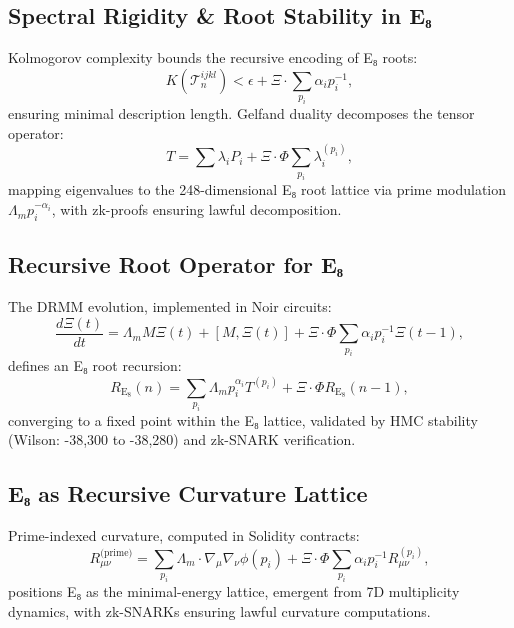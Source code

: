 \documentclass{article}
\theoremstyle{plain}
\begin{document}
\subsection{Spectral Rigidity \& Root Stability in E₈}
Kolmogorov complexity bounds the recursive encoding of E₈ roots:
\begin{equation}
K(\mathcal{T}_n^{ijkl}) < \epsilon + \Xi \cdot \sum_{p_i} \alpha_i p_i^{-1},
\end{equation}
ensuring minimal description length. Gelfand duality decomposes the tensor operator:
\begin{equation}
T = \sum \lambda_i P_i + \Xi \cdot \Phi \sum_{p_i} \lambda_i^{(p_i)},
\end{equation}
mapping eigenvalues to the 248-dimensional E₈ root lattice via prime modulation \(\Lambda_m p_i^{-\alpha_i}\), with zk-proofs ensuring lawful decomposition.

\subsection{Recursive Root Operator for E₈}
The DRMM evolution, implemented in Noir circuits:
\begin{equation}
\frac{d\Xi(t)}{dt} = \Lambda_m M \Xi(t) + [M, \Xi(t)] + \Xi \cdot \Phi \sum_{p_i} \alpha_i p_i^{-1} \Xi(t-1),
\end{equation}
defines an E₈ root recursion:
\begin{equation}
R_{\text{E}_8}(n) = \sum_{p_i} \Lambda_m p_i^{\alpha_i} T^{(p_i)} + \Xi \cdot \Phi R_{\text{E}_8}(n-1),
\end{equation}
converging to a fixed point within the E₈ lattice, validated by HMC stability (Wilson: -38,300 to -38,280) and zk-SNARK verification.

\subsection{E₈ as Recursive Curvature Lattice}
Prime-indexed curvature, computed in Solidity contracts:
\begin{equation}
R_{\mu\nu}^{\text{(prime)}} = \sum_{p_i} \Lambda_m \cdot \nabla_\mu \nabla_\nu \phi(p_i) + \Xi \cdot \Phi \sum_{p_i} \alpha_i p_i^{-1} R_{\mu\nu}^{(p_i)},
\end{equation}
positions E₈ as the minimal-energy lattice, emergent from 7D multiplicity dynamics, with zk-SNARKs ensuring lawful curvature computations.
\end{document}
